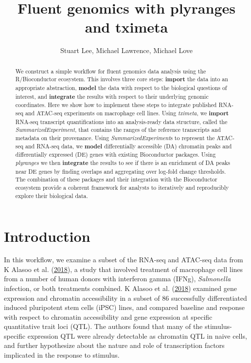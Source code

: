 \documentclass[
]{article}
\title{Fluent genomics with plyranges and tximeta}
\author{Stuart Lee, Michael Lawrence, Michael Love}
\date{}
\begin{document}
\maketitle
\begin{abstract}
We construct a simple workflow for fluent genomics data analysis using the R/Bioconductor ecosystem. This involves three core steps: \textbf{import} the data into an appropriate abstraction, \textbf{model} the data with respect to the biological questions of interest, and \textbf{integrate} the results with respect to their underlying genomic coordinates. Here we show how to implement these steps to integrate published RNA-seq and ATAC-seq experiments on macrophage cell lines. Using \emph{tximeta}, we \textbf{import} RNA-seq transcript quantifications into an analysis-ready data structure, called the \emph{SummarizedExperiment}, that contains the ranges of the reference transcripts and metadata on their provenance. Using \emph{SummarizedExperiment}s to represent the ATAC-seq and RNA-seq data, we \textbf{model} differentially accessible (DA) chromatin peaks and differentially expressed (DE) genes with existing Bioconductor packages. Using \emph{plyranges} we then \textbf{integrate} the results to see if there is an enrichment of DA peaks near DE genes by finding overlaps and aggregating over log-fold change thresholds. The combination of these packages and their integration with the Bioconductor ecosystem provide a coherent framework for analysts to iteratively and reproducibly explore their biological data.
\end{abstract}











\hypertarget{introduction}{%
\section{Introduction}\label{introduction}}

In this workflow, we examine a subset of the RNA-seq and ATAC-seq data from
K Alasoo et al. (\protect\hyperlink{ref-alasoo}{2018}), a study that involved treatment of macrophage cell lines from a number
of human donors with interferon gamma (IFNg), \emph{Salmonella} infection, or both
treatments combined. K Alasoo et al. (\protect\hyperlink{ref-alasoo}{2018}) examined gene expression and chromatin
accessibility in a subset of 86 successfully differentiated induced pluripotent
stem cells (iPSC) lines, and compared baseline and response with respect to
chromatin accessibility and gene expression at specific quantitative trait loci
(QTL). The authors found that many of the stimulus-specific expression QTL were
already detectable as chromatin QTL in naive cells, and further hypothesize
about the nature and role of transcription factors implicated in the response
to stimulus.
\end{document}
